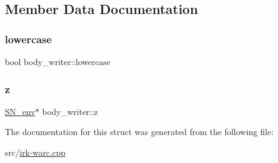 \subsection{Member Data Documentation}
\mbox{\label{structbody__writer_a6df150a131f73f0174993cf6c496312f}} 
\subsubsection{\texorpdfstring{lowercase}{lowercase}}
{\footnotesize\ttfamily bool body\+\_\+writer\+::lowercase}

\mbox{\label{structbody__writer_a1243ddb44270e6f0542f9cb5e31d20d5}} 
\subsubsection{\texorpdfstring{z}{z}}
{\footnotesize\ttfamily \mbox{\hyperlink{structSN__env}{S\+N\+\_\+env}}$\ast$ body\+\_\+writer\+::z}



The documentation for this struct was generated from the following file\+:\begin{DoxyCompactItemize}
\item 
src/\mbox{\hyperlink{irk-warc_8cpp}{irk-\/warc.\+cpp}}\end{DoxyCompactItemize}
